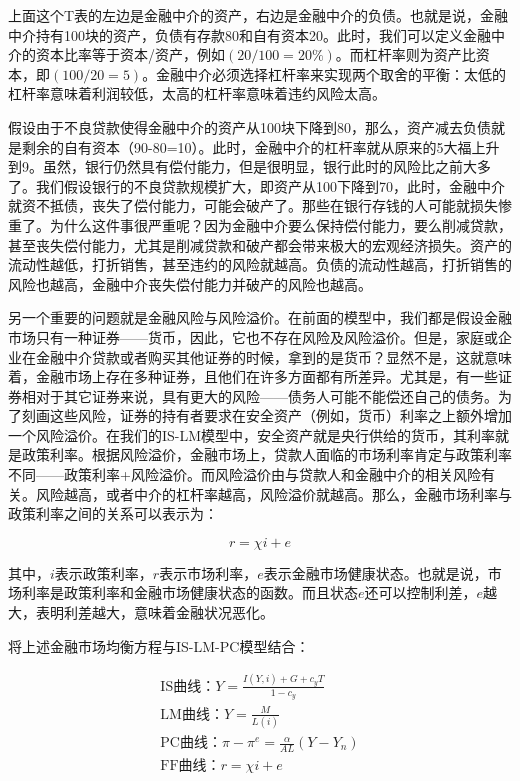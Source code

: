 \documentclass[cn,12pt,math=newtx,citestyle=gb7714-2015,bibstyle=gb7714-2015]{elegantbook}
\begin{document}
	上面这个T表的左边是金融中介的资产，右边是金融中介的负债。也就是说，金融中介持有100块的资产，负债有存款80和自有资本20。此时，我们可以定义金融中介的资本比率等于资本/资产，例如$(20 / 100 =20\%)$。而杠杆率则为资产比资本，即$(100 / 20 = 5)$。金融中介必须选择杠杆率来实现两个取舍的平衡：太低的杠杆率意味着利润较低，太高的杠杆率意味着违约风险太高。
	
	假设由于不良贷款使得金融中介的资产从100块下降到80，那么，资产减去负债就是剩余的自有资本（90-80=10）。此时，金融中介的杠杆率就从原来的5大福上升到9。虽然，银行仍然具有偿付能力，但是很明显，银行此时的风险比之前大多了。我们假设银行的不良贷款规模扩大，即资产从100下降到70，此时，金融中介就资不抵债，丧失了偿付能力，可能会破产了。那些在银行存钱的人可能就损失惨重了。为什么这件事很严重呢？因为金融中介要么保持偿付能力，要么削减贷款，甚至丧失偿付能力，尤其是削减贷款和破产都会带来极大的宏观经济损失。资产的流动性越低，打折销售，甚至违约的风险就越高。负债的流动性越高，打折销售的风险也越高，金融中介丧失偿付能力并破产的风险也越高。
	
	另一个重要的问题就是金融风险与风险溢价。在前面的模型中，我们都是假设金融市场只有一种证券——货币，因此，它也不存在风险及风险溢价。但是，家庭或企业在金融中介贷款或者购买其他证券的时候，拿到的是货币？显然不是，这就意味着，金融市场上存在多种证券，且他们在许多方面都有所差异。尤其是，有一些证券相对于其它证券来说，具有更大的风险——债务人可能不能偿还自己的债务。为了刻画这些风险，证券的持有者要求在安全资产（例如，货币）利率之上额外增加一个风险溢价。在我们的IS-LM模型中，安全资产就是央行供给的货币，其利率就是政策利率。根据风险溢价，金融市场上，贷款人面临的市场利率肯定与政策利率不同——政策利率+风险溢价。而风险溢价由与贷款人和金融中介的相关风险有关。风险越高，或者中介的杠杆率越高，风险溢价就越高。那么，金融市场利率与政策利率之间的关系可以表示为：
	
	\begin{equation}
		r = \chi i +e
	\end{equation}

其中，$i$表示政策利率，$r$表示市场利率，$e$表示金融市场健康状态。也就是说，市场利率是政策利率和金融市场健康状态的函数。而且状态$e$还可以控制利差，$e$越大，表明利差越大，意味着金融状况恶化。

将上述金融市场均衡方程与IS-LM-PC模型结合：

	\begin{equation}
	\begin{array}{l}
		\text{IS曲线：}   Y = \frac{I(Y,i)+G+c_y T}{1-c_y}\\
		\text{LM曲线：}     Y=\frac{M}{L(i)}\\
		\text{PC曲线：}   \pi -\pi^e = \frac{\alpha}{ AL} (Y -Y_n)\\
			\text{FF曲线：}    r = \chi i +e
	\end{array}
\end{equation}
\end{document}
